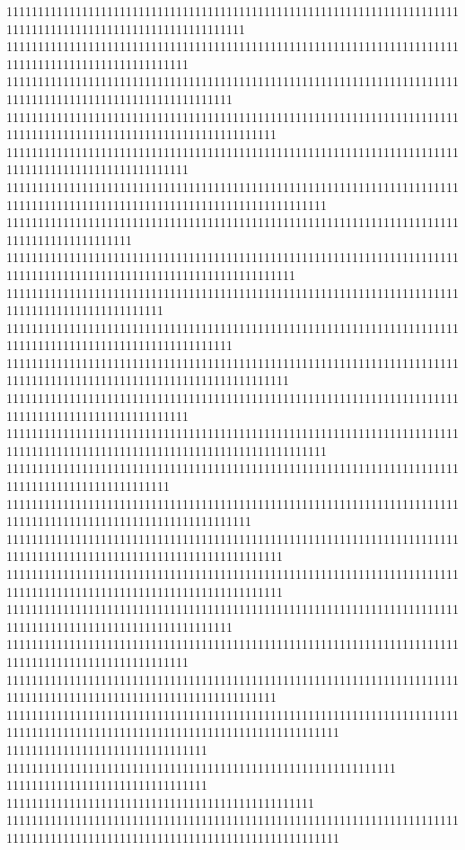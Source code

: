 11111111111111111111111111111111111111111111111111111111111111111111111111111111111111111111111111111111111111
11111111111111111111111111111111111111111111111111111111111111111111111111111111111111111111111111111
111111111111111111111111111111111111111111111111111111111111111111111111111111111111111111111111111111111111
1111111111111111111111111111111111111111111111111111111111111111111111111111111111111111111111111111111111111111111
11111111111111111111111111111111111111111111111111111111111111111111111111111111111111111111111111111
111111111111111111111111111111111111111111111111111111111111111111111111111111111111111111111111111111111111111111111111111
11111111111111111111111111111111111111111111111111111111111111111111111111111111111111111111
1111111111111111111111111111111111111111111111111111111111111111111111111111111111111111111111111111111111111111111111
1111111111111111111111111111111111111111111111111111111111111111111111111111111111111111111111111
111111111111111111111111111111111111111111111111111111111111111111111111111111111111111111111111111111111111
111111111111111111111111111111111111111111111111111111111111111111111111111111111111111111111111111111111111111111111
11111111111111111111111111111111111111111111111111111111111111111111111111111111111111111111111111111
111111111111111111111111111111111111111111111111111111111111111111111111111111111111111111111111111111111111111111111111111
11111111111111111111111111111111111111111111111111111111111111111111111111111111111111111111111111
111111111111111111111111111111111111111111111111111111111111111111111111111111111111111111111111111111111111111
11111111111111111111111111111111111111111111111111111111111111111111111111111111111111111111111111111111111111111111
11111111111111111111111111111111111111111111111111111111111111111111111111111111111111111111111111111111111111111111
111111111111111111111111111111111111111111111111111111111111111111111111111111111111111111111111111111111111
11111111111111111111111111111111111111111111111111111111111111111111111111111111111111111111111111111
1111111111111111111111111111111111111111111111111111111111111111111111111111111111111111111111111111111111111111111
11111111111111111111111111111111111111111111111111111111111111111111111111111111111111111111111111111111111111111111111111111
11111111111111111111111111111111
11111111111111111111111111111111111111111111111111111111111111
11111111111111111111111111111111
1111111111111111111111111111111111111111111111111
11111111111111111111111111111111111111111111111111111111111111111111111111111111111111111111111111111111111111111111111111111
